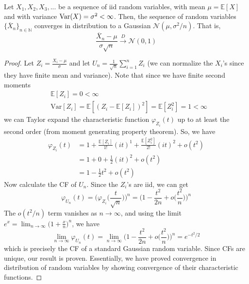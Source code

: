   \begin{theorem}
    Let $X_1, X_2, X_3, ...$ be a sequence of iid random variables, with mean $\mu = \mathbb{E}[X]$ and with variance $\Var(X) = \sigma^2 < \infty$. Then, the sequence of random variables $\{\overline{X}_n\}_{n \in \mathbb{N}}$ converges in distribution to a Gaussian $\mathcal{N}(\mu, \sigma^2 / n)$. That is, 
    \begin{equation}
      \frac{\overline{X}_n - \mu}{\sigma \sqrt{n}} \xrightarrow{D} \mathcal{N}(0, 1)
    \end{equation}
  \end{theorem}
  \begin{proof}
    Let $Z_i = \frac{X_i - \mu}{\sigma}$ and let $U_n = \frac{1}{\sqrt{n}} \sum_{i=1}^n Z_i$ (we can normalize the $X_i$'s since they have finite mean and variance). Note that since we have finite second moments 
    \begin{align*}
      & \mathbb{E}[Z_i] = 0 < \infty \\
      & \mathrm{Var}[Z_i] = \mathbb{E}[ (Z_i - \mathbb{E}[Z_i])^2] = \mathbb{E}[Z_i^2] = 1 < \infty 
    \end{align*}
    we can Taylor expand the characteristic function $\varphi_{Z_i} (t)$ up to at least the second order (from moment generating property theorem). So, we have 
    \begin{align*}
      \varphi_{Z_i} (t) & = 1 + \frac{\mathbb{E}[Z_i]}{1!} (i t)^1 + \frac{\mathbb{E}[Z_i^2]}{2!} (i t)^2 + o (t^2) \\
      & = 1 + 0 + \frac{1}{2} (i t)^2 + o (t^2) \\
      & = 1 - \frac{1}{2} t^2 + o(t^2) 
    \end{align*}
    Now calculate the CF of $U_n$. Since the $Z_i$'s are iid, we can get 
    \begin{equation}
      \varphi_{U_n} (t) = \Big( \varphi_{Z_i} \big( \frac{t}{\sqrt{n}} \big) \Big)^n = \Big( 1 - \frac{t^2}{2n} + o \big( \frac{t^2}{n} \big) \Big)^n
    \end{equation}
    The $o(t^2 / n)$ term vanishes as $n \rightarrow \infty$, and using the limit $e^x = \lim_{n \rightarrow \infty} \big( 1 + \frac{x}{n} \big)^n$, we have 
    \begin{equation}
      \lim_{n \rightarrow \infty} \varphi_{U_n} (t) = \lim_{n \rightarrow \infty} \Big( 1 - \frac{t^2}{2n} + o \big( \frac{t^2}{n} \big) \Big)^n = e^{-t^2 / 2}
    \end{equation}
    which is precisely the CF of a standard Gaussian random variable. Since CFs are unique, our result is proven. Essentially, we have proved convergence in distribution of random variables by showing convergence of their characteristic functions. 
  \end{proof}

